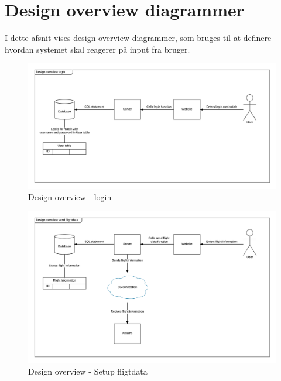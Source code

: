 \section{Design overview diagrammer}

I dette afsnit vises design overview diagrammer, som bruges til at definere hvordan systemet skal reagerer på input fra bruger.

\vspace{-5pt}
\begin{figure}[H]
	\centering
	\includegraphics[width=1\textwidth]{Billeder/Design_overview/design_overview_login}
	\vspace{-1cm}
	\caption{Design overview - login}
	\label{fig:pakke_diagram}
\end{figure}

\vspace{-5pt}
\begin{figure}[H]
	\centering
	\includegraphics[width=1\textwidth]{Billeder/Design_overview/design_overview_setupFlightdata}
	\vspace{-1cm}
	\caption{Design overview - Setup fligtdata}
	\label{fig:pakke_diagram}
\end{figure}